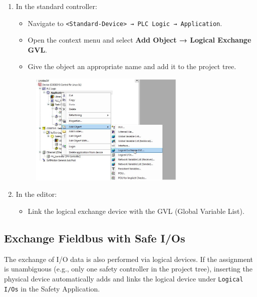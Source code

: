 \documentclass[a4paper,12pt]{article}
\begin{document}
\begin{enumerate}
	\item In the standard controller:
	\begin{itemize}
		\item Navigate to \texttt{<Standard-Device> → PLC Logic → Application}.
		\item Open the context menu and select \textbf{Add Object → Logical Exchange GVL}.
		\item Give the object an appropriate name and add it to the project tree.
	\end{itemize}
	\begin{figure}[H]
		\centering
		\includegraphics[width=0.7\textwidth]{19.JPG}
	\end{figure}
	
	\item In the editor:
	\begin{itemize}
		\item Link the logical exchange device with the GVL (Global Variable List).
	\end{itemize}
\end{enumerate}

\subsection{Exchange Fieldbus with Safe I/Os}
The exchange of I/O data is also performed via logical devices. If the assignment is unambiguous (e.g., only one safety controller in the project tree), inserting the physical device automatically adds and links the logical device under \texttt{Logical I/Os} in the Safety Application.
\end{document}
